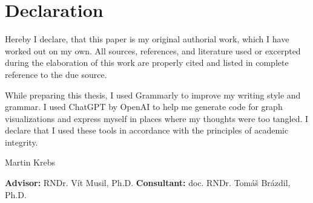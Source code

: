 \chapter*{Declaration}

\noindent
Hereby I declare, that this paper is my original authorial work, which I have worked out on my own.
All sources, references, and literature used or excerpted during the elaboration of this work are properly cited and listed in complete reference to the due source.

While preparing this thesis, I used Grammarly to improve my writing style and grammar.
I used ChatGPT by OpenAI to help me generate code for graph visualizations and express myself in places where my thoughts were too tangled.
I declare that I used these tools in accordance with the principles of academic integrity.

\vspace{1cm}
\begin{flushright}
    Martin Krebs
\end{flushright}
\vfill
\textbf{Advisor:} RNDr. Vít Musil, Ph.D.
\newline
\textbf{Consultant:} doc. RNDr. Tomáš Brázdil, Ph.D.
